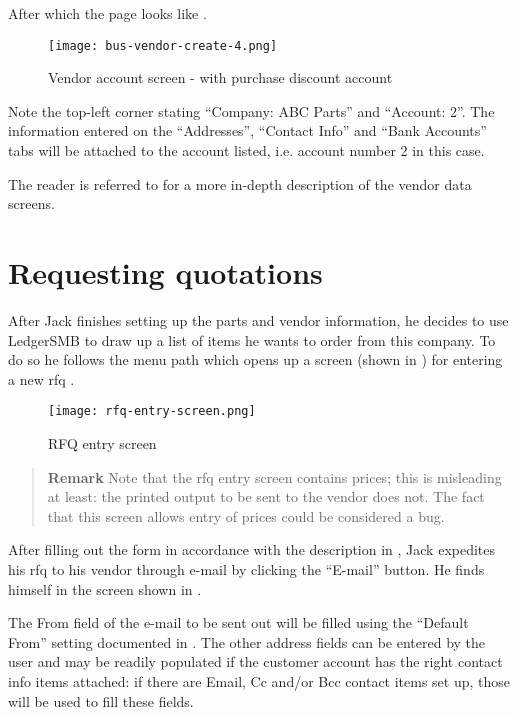 After which the page looks like .

\begin{figure}[h]
\centering
\texttt{[image: bus-vendor-create-4.png]}
\caption{Vendor account screen - with purchase discount account}
\label{fig:vendor-create-3}
\end{figure}

Note the top-left corner stating ``Company: ABC Parts'' and ``Account: 2''. The information
entered on the ``Addresses'', ``Contact Info'' and ``Bank Accounts'' tabs will be attached
to the account listed, i.e. account number 2 in this case.

The reader is referred to  for a more in-depth
description of the vendor data screens.

\section{Requesting quotations}
\label{sec-stock-request-quotation}

After Jack finishes setting up the parts and vendor information, he decides to use LedgerSMB to draw
up a list of items he wants to order from this company. To do so he follows the menu path
 which opens up a screen (shown
in ) for entering a new \gls{rfq} .

\begin{figure}[h]
\centering
\texttt{[image: rfq-entry-screen.png]}
\caption{RFQ entry screen}
\label{fig:bus-rfq-entry-screen}
\end{figure}

\begin{quotation}
\textbf{Remark} Note that the \gls{rfq} entry screen contains prices; this is misleading
at least: the printed output to be sent to the vendor does not. The fact that this screen
allows entry of prices could be considered a bug.
\end{quotation}

After filling out the form in accordance with the description in ,
Jack expedites his \gls{rfq} to his vendor through e-mail by clicking the ``E-mail'' button. He finds
himself in the screen shown in .

The From field of the e-mail to be sent out will be filled using the ``Default From'' setting documented
in . The other address fields can be entered by the user and may be readily
populated if the customer account has the right contact info items attached: if there are Email, Cc and/or
Bcc contact items set up, those will be used to fill these fields.

